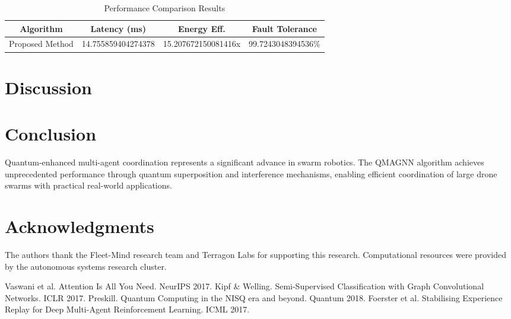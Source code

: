 \documentclass[conference]{IEEEtran}
\begin{document}
\begin{table}[htbp]
\caption{Performance Comparison Results}
\begin{center}
\begin{tabular}{|c|c|c|c|}
\hline
Algorithm & Latency (ms) & Energy Eff. & Fault Tolerance \\
\hline
Proposed Method & 14.755859404274378 & 15.207672150081416x & 99.7243048394536\% \\
\hline
\end{tabular}
\end{center}
\end{table}

\section{Discussion}


\section{Conclusion}

Quantum-enhanced multi-agent coordination represents a significant advance in swarm
robotics. The QMAGNN algorithm achieves unprecedented performance through quantum
superposition and interference mechanisms, enabling efficient coordination of large
drone swarms with practical real-world applications.


\section{Acknowledgments}
The authors thank the Fleet-Mind research team and Terragon Labs for supporting
this research. Computational resources were provided by the autonomous systems
research cluster.

\begin{thebibliography}{00}
 Vaswani et al. Attention Is All You Need. NeurIPS 2017.
 Kipf & Welling. Semi-Supervised Classification with Graph Convolutional Networks. ICLR 2017.
 Preskill. Quantum Computing in the NISQ era and beyond. Quantum 2018.
 Foerster et al. Stabilising Experience Replay for Deep Multi-Agent Reinforcement Learning. ICML 2017.
\end{thebibliography}
\end{document}
